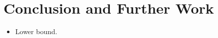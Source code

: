 \documentclass[authoryear]{elsarticle}
\begin{document}
\section{Conclusion and Further Work}
\label{sec:conclusion}
{\color{myPurple}
\begin{itemize}[leftmargin=*]
	\item Lower bound.
\end{itemize}
}

\begin{comment}
\section{Checklist}
{\color{myAqua}
\begin{itemize}[leftmargin=*]
	\item Vicinal \emph{sum} constraint, not vicinal \emph{score} constraint.
	\item All dashes $'$ not '. 
	\item Abbreviations (SCPP, SubSCP, AHC etc.) spelling and being used correctly.
	\item Figure and table captions.
	\item Check that correct figures and equations are being referred to in text.
	\item Zenodo links DOI.
	\item State specification of computers used for experiments.
	\item Section and subsection titles, capitalisation and spelling.
	\item All figures have same line thickness, dashed line density and thickness, label size, vertex size, and colour (use tikz colours \texttt{tRed} and \texttt{tBlue}).
	\item All figures aligned correctly, subfigures aligned so that the captions are level.
	\item \texttt{$\backslash$noindent} only used when required, after equations, check if needed after definitions/figures/tables etc.
	\item Equations referenced using \texttt{$\backslash$eqref}, not \texttt{$\backslash$ref}.
	\item Tilde $\sim$ before all \texttt{$\backslash$ref} and \texttt{$\backslash$eqref}.
	\item Font/colours of figures clear, labels legible.
	\item American/British spelling.
	\item Word repetitions, duplicate statements.

\end{comment}
\end{document}
